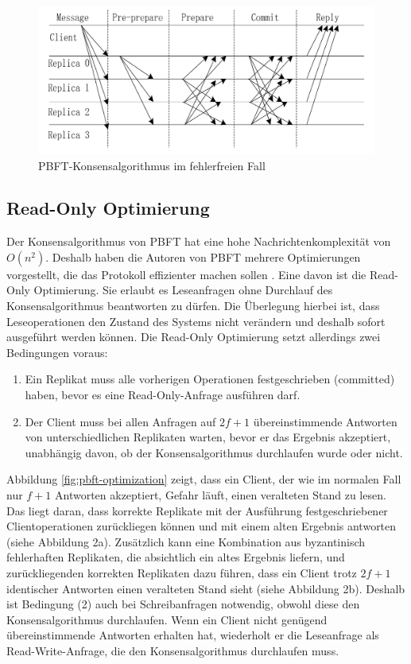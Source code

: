 \documentclass[nonacm,sigconf,natbib=false]{acmart}
\begin{document}
\begin{figure}[htbp]
  \centering
  \includegraphics[width=\linewidth]{pbft-normal.png}
  \caption{PBFT-Konsensalgorithmus im fehlerfreien Fall}
  \label{fig:pbft-normal}
\end{figure}

\subsection{Read-Only Optimierung}

Der Konsensalgorithmus von PBFT hat eine hohe Nachrichtenkomplexität von $O(n^2)$. Deshalb haben die Autoren von PBFT mehrere Optimierungen vorgestellt, die das Protokoll effizienter machen sollen \cite{pbft-optimization}. Eine davon ist die Read-Only Optimierung. Sie erlaubt es Leseanfragen ohne Durchlauf des Konsensalgorithmus beantworten zu dürfen. Die Überlegung hierbei ist, dass Leseoperationen den Zustand des Systems nicht verändern und deshalb sofort ausgeführt werden können. Die Read-Only Optimierung setzt allerdings zwei Bedingungen voraus:
\begin{enumerate}
  \item Ein Replikat muss alle vorherigen Operationen festgeschrieben (committed) haben, bevor es eine Read-Only-Anfrage ausführen darf.
  \item Der Client muss bei allen Anfragen auf $2f+1$ übereinstimmende Antworten von unterschiedlichen Replikaten warten, bevor er das Ergebnis akzeptiert, unabhängig davon, ob der Konsensalgorithmus durchlaufen wurde oder nicht. 
\end{enumerate}
Abbildung \ref{fig:pbft-optimization} zeigt, dass ein Client, der wie im normalen Fall nur $f+1$ Antworten akzeptiert, Gefahr läuft, einen veralteten Stand zu lesen. Das liegt daran, dass korrekte Replikate mit der Ausführung festgeschriebener Clientoperationen zurückliegen können und mit einem alten Ergebnis antworten (siehe Abbildung 2a). Zusätzlich kann eine Kombination aus byzantinisch fehlerhaften Replikaten, die absichtlich ein altes Ergebnis liefern, und zurückliegenden korrekten Replikaten dazu führen, dass ein Client trotz $2f+1$ identischer Antworten einen veralteten Stand sieht (siehe Abbildung 2b). Deshalb ist Bedingung (2) auch bei Schreibanfragen notwendig, obwohl diese den Konsensalgorithmus durchlaufen. Wenn ein Client nicht genügend übereinstimmende Antworten erhalten hat, wiederholt er die Leseanfrage als Read-Write-Anfrage, die den Konsensalgorithmus durchlaufen muss.
\end{document}
